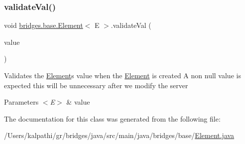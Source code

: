 \mbox{\label{classbridges_1_1base_1_1_element_af1a60f4e6a91d379179f7d56e6dc3829}} 
\subsubsection{\texorpdfstring{validateVal()}{validateVal()}}
{\footnotesize\ttfamily void \mbox{\hyperlink{classbridges_1_1base_1_1_element}{bridges.\+base.\+Element}}$<$ E $>$.validate\+Val (\begin{DoxyParamCaption}\item[{E}]{value }\end{DoxyParamCaption})\hspace{0.3cm}{\ttfamily [protected]}}

Validates the \mbox{\hyperlink{classbridges_1_1base_1_1_element}{Element}}\textquotesingle{}s value when the \mbox{\hyperlink{classbridges_1_1base_1_1_element}{Element}} is created A non null value is expected this will be unnecessary after we modify the server 
\begin{DoxyParams}{Parameters}
{\em $<$\+E$>$} & value \\
\hline
\end{DoxyParams}


The documentation for this class was generated from the following file\+:\begin{DoxyCompactItemize}
\item 
/\+Users/kalpathi/gr/bridges/java/src/main/java/bridges/base/\mbox{\hyperlink{_element_8java}{Element.\+java}}\end{DoxyCompactItemize}
